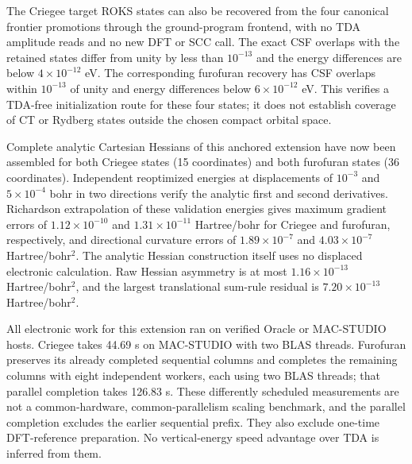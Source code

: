 The Criegee target ROKS states can also be recovered from the four canonical
frontier promotions through the ground-program frontend, with no TDA
amplitude reads and no new DFT or SCC call. The exact CSF overlaps with the
retained states differ from unity by less than $10^{-13}$ and the energy
differences are below $4\times10^{-12}$ eV. The corresponding furofuran
recovery has CSF overlaps within $10^{-13}$ of unity and energy differences
below $6\times10^{-12}$ eV. This verifies a TDA-free initialization route
for these four states; it does not establish coverage of CT or Rydberg
states outside the chosen compact orbital space.

Complete analytic Cartesian Hessians of this anchored extension have now
been assembled for both Criegee states (15 coordinates) and both furofuran
states (36 coordinates). Independent reoptimized energies at displacements
of $10^{-3}$ and $5\times10^{-4}$ bohr in two directions verify the
analytic first and second derivatives. Richardson extrapolation of these
validation energies gives maximum gradient errors of $1.12\times10^{-10}$
and $1.31\times10^{-11}$ Hartree/bohr for Criegee and furofuran,
respectively, and directional curvature errors of $1.89\times10^{-7}$ and
$4.03\times10^{-7}$ Hartree/bohr$^2$. The analytic Hessian construction itself
uses no displaced electronic calculation. Raw Hessian asymmetry is at most
$1.16\times10^{-13}$ Hartree/bohr$^2$, and the largest translational sum-rule
residual is $7.20\times10^{-13}$ Hartree/bohr$^2$.

All electronic work for this extension ran on verified Oracle or MAC-STUDIO
hosts. Criegee takes 44.69 s on MAC-STUDIO with two BLAS threads. Furofuran
preserves its already completed sequential columns and completes the remaining
columns with eight independent workers, each using two BLAS threads; that
parallel completion takes 126.83 s. These differently scheduled measurements
are not a common-hardware, common-parallelism scaling benchmark, and the
parallel completion excludes the earlier sequential prefix. They also exclude
one-time DFT-reference preparation. No vertical-energy speed advantage over
TDA is inferred from them.
